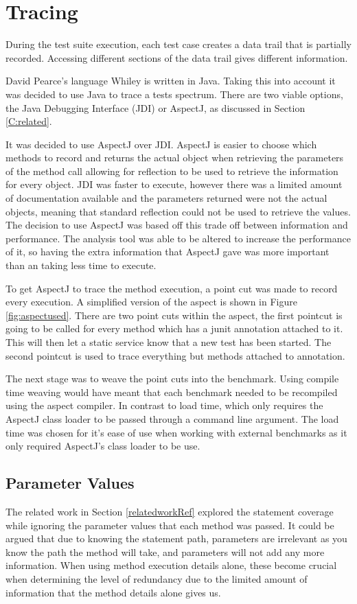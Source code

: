 \section{Tracing}
\label{S:trace}
During the test suite execution, each test case creates a data trail that is partially recorded. Accessing different sections of the data trail gives different information. 

David Pearce's language Whiley is written in Java. Taking this into account it was decided to use Java to trace a tests spectrum. There are two viable options, the Java Debugging Interface (JDI) or AspectJ, as discussed in Section \ref{C:related}. 

It was decided to use AspectJ over JDI. AspectJ is easier to choose which methods to record and returns the actual object when retrieving the parameters of the method call allowing for reflection to be used to retrieve the information for every object. JDI was faster to execute, however there was a limited amount of documentation available and the parameters returned were not the actual objects, meaning that standard reflection could not be used to retrieve the values. The decision to use AspectJ was based off this trade off between information and performance. The analysis tool was able to be altered to increase the performance of it, so having the extra information that AspectJ gave was more important than an taking less time to execute. 

To get AspectJ to trace the method execution, a point cut was made to record every execution. A simplified version of the aspect is shown in Figure \ref{fig:aspectused}. There are two point cuts within the aspect, the first pointcut is going to be called for every method which has a junit \@Test annotation attached to it. This will then let a static service know that a new test has been started. The second pointcut is used to trace everything but methods attached to \@Test annotation. 

The next stage was to weave the point cuts into the benchmark. Using compile time weaving would have meant that each benchmark needed to be recompiled using the aspect compiler. In contrast to load time, which only requires the AspectJ class loader to be passed through a command line argument. The load time was chosen for it's ease of use when working with external benchmarks as it only required AspectJ's class loader to be use.

\subsection{Parameter Values}
The related work in Section \ref{relatedworkRef} explored the statement coverage while ignoring the parameter values that each method was passed. It could be argued that due to knowing the statement path, parameters are irrelevant as you know the path the method will take, and parameters will not add any more information. When using method execution details alone, these become crucial when determining the level of redundancy due to the limited amount of information that the method details alone gives us. 

